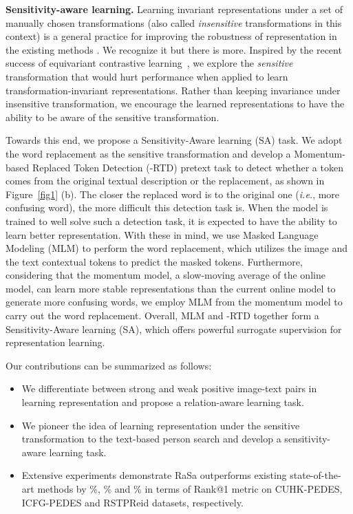 \documentclass{article}
\begin{document}
\textbf{Sensitivity-aware learning.}
Learning invariant representations under a set of manually chosen transformations (also called \emph{insensitive} transformations in this context) is a general practice for improving the robustness of representation in the existing methods \cite{caron2020unsupervised,chen2021exploring}.
We recognize it but there is more.
Inspired by the recent success of equivariant contrastive learning~\cite{dangovski2022equivariant}, we explore the \emph{sensitive} transformation that would hurt performance when applied to learn transformation-invariant representations.
Rather than keeping invariance under insensitive transformation, we encourage the learned representations to have the ability to be aware of the sensitive transformation.

Towards this end, we propose a Sensitivity-Aware learning (SA) task.
We adopt the word replacement as the sensitive transformation and develop a Momentum-based Replaced Token Detection (-RTD) pretext task to detect whether a token comes from the original textual description or the replacement, as shown in Figure~\ref{fig1} (b).
The closer the replaced word is to the original one (\emph{i.e.}, more confusing word), the more difficult this detection task is. 
When the model is trained to well solve such a detection task, it is expected to have the ability to learn better representation.
With these in mind, we use Masked Language Modeling (MLM) to perform the word replacement, which utilizes the image and the text contextual tokens to predict the masked tokens.
Furthermore, considering that the momentum model, a slow-moving average of the online model, can learn more stable representations than the current online model \cite{grill2020bootstrap} to generate more confusing words, we employ MLM from the momentum model to carry out the word replacement.
Overall, MLM and -RTD together form a Sensitivity-Aware learning (SA), which offers powerful surrogate supervision for representation learning.

Our contributions can be summarized as follows:
\begin{itemize}
\item We differentiate between strong and weak positive image-text pairs in learning representation and propose a relation-aware learning task.
\item We pioneer the idea of learning representation under the sensitive transformation to the text-based person search and develop a sensitivity-aware learning task.
\item 
Extensive experiments demonstrate RaSa outperforms existing state-of-the-art methods by \%, \% and \% in terms of Rank@1 metric on CUHK-PEDES, ICFG-PEDES and RSTPReid datasets, respectively.
\end{itemize}
\end{document}
